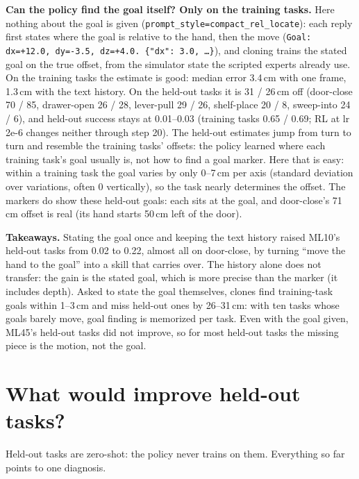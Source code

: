\documentclass[11pt]{article}
\newcommand{\code}[1]{\texttt{#1}}
\newcommand{\takeaway}[1]{\par\smallskip\noindent\colorbox{boxbg}{\parbox{\dimexpr\linewidth-2\fboxsep}{\small\textbf{Takeaways.} #1}}\par\smallskip}
\begin{document}
\textbf{Can the policy find the goal itself? Only on the training tasks.} Here nothing about the goal is given
(\code{prompt\_style=compact\_rel\_locate}): each reply first states where the goal is relative to the hand, then the move
(\code{Goal: dx=+12.0, dy=-3.5, dz=+4.0. \{"dx": 3.0, \dots\}}), and cloning trains the stated goal on the true offset,
from the simulator state the scripted experts already use. On the training tasks the estimate is good: median error
3.4\,cm with one frame, 1.3\,cm with the text history. On the held-out tasks it is 31 / 26\,cm off (door-close 70 / 85,
drawer-open 26 / 28, lever-pull 29 / 26, shelf-place 20 / 8, sweep-into 24 / 6), and held-out success stays at 0.01--0.03
(training tasks 0.65 / 0.69; RL at lr 2e-6 changes neither through step 20). The held-out estimates jump from turn to
turn and resemble the training tasks' offsets: the policy learned where each training task's goal usually is, not how to
find a goal marker. Here that is easy: within a training task the goal varies by only 0--7\,cm per axis (standard
deviation over variations, often 0 vertically), so the task nearly determines the offset. The markers do show these
held-out goals: each sits at the goal, and door-close's 71\,cm offset is real (its hand starts 50\,cm left of the door).

\takeaway{Stating the goal once and keeping the text history raised ML10's held-out tasks from 0.02 to 0.22, almost all
on door-close, by turning ``move the hand to the goal'' into a skill that carries over. The history alone does not
transfer: the gain is the stated goal, which is more precise than the marker (it includes depth). Asked to state the
goal themselves, clones find training-task goals within 1--3\,cm and miss held-out ones by 26--31\,cm: with ten tasks
whose goals barely move, goal finding is memorized per task. Even with the goal given, ML45's held-out tasks did not
improve, so for most held-out tasks the missing piece is the motion, not the goal.}

\section{What would improve held-out tasks?}
\label{sec:whatnext}
Held-out tasks are zero-shot: the policy never trains on them. Everything so far points to one diagnosis.
\end{document}
